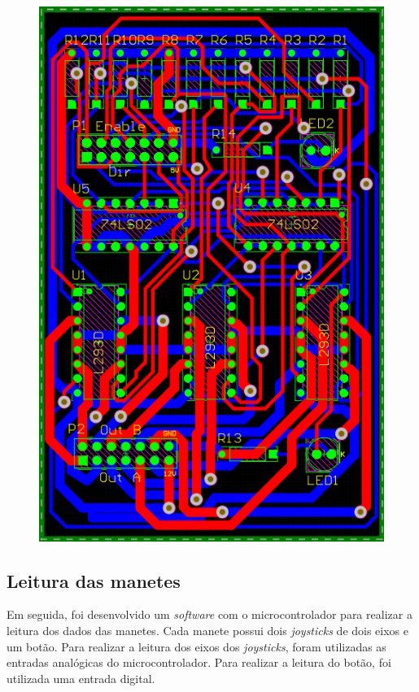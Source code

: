 \begin{figure}[H]
\begin{minipage}{.5\textwidth}
        \includegraphics[keepaspectratio=true, width=0.9\linewidth]
            {img/placa-controle-esquematico.png}
        \label{fig:placaControleEsquematico}
    \end{minipage}%
\end{figure}

\subsection[Leitura das manetes]{Leitura das manetes}

Em seguida, foi desenvolvido um \textit{software} com o microcontrolador para realizar a leitura dos dados das manetes.
Cada manete possui dois \textit{joysticks} de dois eixos e um botão.
Para realizar a leitura dos eixos dos \textit{joysticks}, foram utilizadas as entradas analógicas do microcontrolador.
Para realizar a leitura do botão, foi utilizada uma entrada digital.

